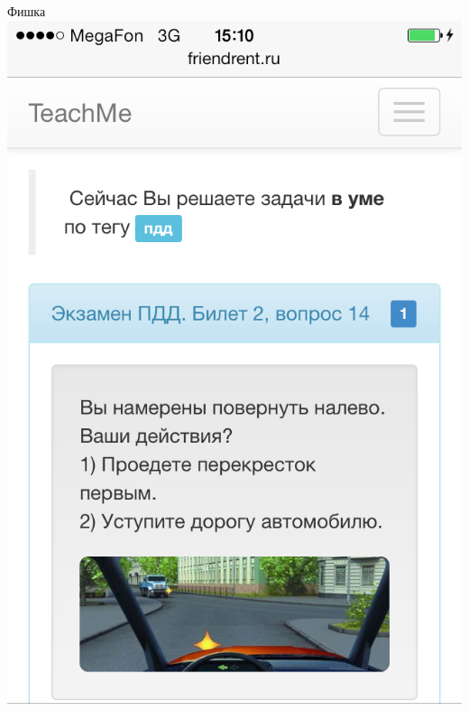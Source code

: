 \documentclass[fullscreen, unicode, bookmarks = false]{beamer}
\begin{document}
    \begin{frame}{Фишка}
        \includegraphics[scale=0.22]{fish31.png}~~~~~

\end{frame}
\end{document}
